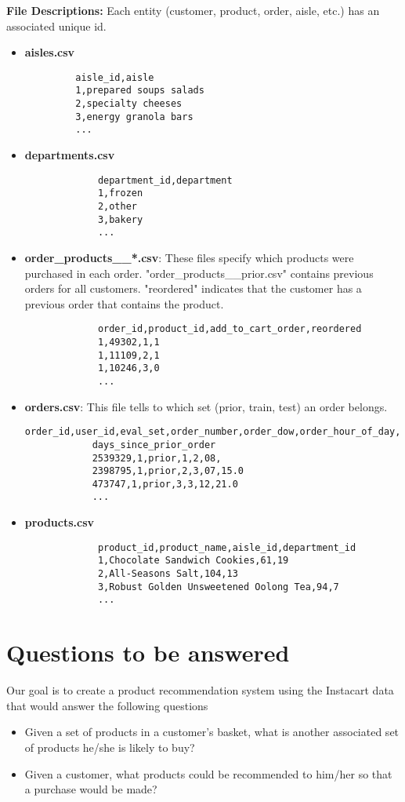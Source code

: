 \documentclass[12pt]{article}
\begin{document}
\textbf{File Descriptions:}\cite{instacartkaggle}
Each entity (customer, product, order, aisle, etc.) has an associated unique id.
\begin{itemize}
	\item \textbf{aisles.csv}
		\begin{verbatim}
		 aisle_id,aisle  
		 1,prepared soups salads  
		 2,specialty cheeses  
		 3,energy granola bars  
		 ...
		\end{verbatim}
	\item \textbf{departments.csv}
		\begin{verbatim}
			 department_id,department  
			 1,frozen  
			 2,other  
			 3,bakery  
			 ...	
		\end{verbatim}
	\item \textbf{order\_products\_\_*.csv}: These files specify which products were purchased in each order. "order\_products\_\_prior.csv" contains previous orders for all customers. "reordered" indicates that the customer has a previous order that contains the product.
	
		\begin{verbatim}
			 order_id,product_id,add_to_cart_order,reordered  
			 1,49302,1,1  
			 1,11109,2,1  
			 1,10246,3,0  
			 ... 
		\end{verbatim}
	\item \textbf{orders.csv}: This file tells to which set (prior, train, test) an order belongs.
		\begin{verbatim}order_id,user_id,eval_set,order_number,order_dow,order_hour_of_day,
		    days_since_prior_order  
			2539329,1,prior,1,2,08,	  
			2398795,1,prior,2,3,07,15.0  
			473747,1,prior,3,3,12,21.0  
			...	
		\end{verbatim}

	\item \textbf{products.csv}
		\begin{verbatim}
			 product_id,product_name,aisle_id,department_id
			 1,Chocolate Sandwich Cookies,61,19  
			 2,All-Seasons Salt,104,13  
			 3,Robust Golden Unsweetened Oolong Tea,94,7  
			 ...
		\end{verbatim}
\end{itemize}

\section{Questions to be answered}
Our goal is to create a product recommendation system using the Instacart data that would answer the following questions
\begin{itemize}
\item Given a set of products in a customer's basket, what is another associated set of products he/she is likely to buy?
\item Given a customer, what products could be recommended to him/her so that a purchase would be made?
\end{itemize}
\end{document}
